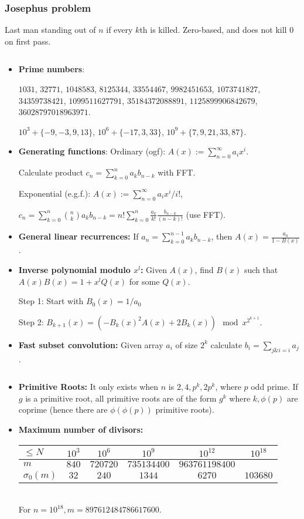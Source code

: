 \documentclass[8pt,a4paper,landscape,oneside]{amsart}
\newcommand{\mintedstyle}[2]{\inputminted[fontsize=\normalsize,baselinestretch=.9,breaklines,breakautoindent,tabsize=2]{#1}{code/#2}}
\newcommand{\code}[1]{\mintedstyle{cpp}{#1}}
\newcommand*\BitAnd{\mathrel{\&}}
\newenvironment{myitemize}
{\begin{itemize}[leftmargin=.3cm]
	\setlength{\itemsep}{0pt}
	\setlength{\parskip}{0pt}
	\setlength{\parsep}{0pt}     }
{ \end{itemize}                  }
\begin{document}
\begin{multicols*}{3}
\subsubsection{Josephus problem}
Last man standing out of $n$ if every $k$th is killed. Zero-based, and
does not kill $0$ on first pass.
\code{math/josephus.cpp}

\begin{myitemize}
	\item \textbf{Prime numbers}:

	$1031$, $32771$, $1048583$, $8125344$, $33554467$, $9982451653$, $1073741827$, $34359738421$, $1099511627791$, $35184372088891$, $1125899906842679$, $36028797018963971$.

	$10^3 + \{-9,-3,9,13\}$, $10^6 + \{-17,3,33\}$, $10^9+ \{7,9,21,33,87\}$.

	\item \textbf{Generating functions}:
	Ordinary (ogf): $A(x) := \sum_{n=0}^{\infty} a_i x^i$.

	Calculate product $c_n = \sum_{k=0}^{n} a_k b_{n-k}$ with FFT.

	Exponential (e.g.f.): $A(x) := \sum_{n=0}^{\infty} a_i x^i/i!$,

	$c_n = \sum_{k=0}^{n} \binom{n}{k} a_k b_{n-k} = n! \sum_{k=0}^{n} \frac{a_k}{k!} \frac{b_{n-k}}{(n-k)!}$ (use FFT).

\item \textbf{General linear recurrences:}
	If $a_n = \sum_{k=0}^{n-1} a_k b_{n-k}$, then $A(x) = \frac{a_0}{1-B(x)}$.

\item \textbf{Inverse polynomial modulo $x^l$:}
	Given $A(x)$, find $B(x)$ such that $A(x)B(x) = 1 + x^l Q(x)$ for some $Q(x)$.

	Step 1: Start with $B_0(x) = 1/a_0$

	Step 2: $B_{k+1}(x) = (-B_k(x)^2 A(x) + 2 B_k(x)) \mod x^{2^{k+1}}$.

\item \textbf{Fast subset convolution:}
	Given array $a_i$ of size $2^k$ calculate $b_i = \sum_{j \BitAnd i = i} a_j$.
	\code{math/subset_conv.cpp}

\item \textbf{Primitive Roots:}
	It only exists when $n$ is $2, 4, p^k, 2p^k$, where $p$ odd prime.
	If $g$ is a primitive root, all primitive roots are of the form $g^k$
	where $k,\phi(p)$ are coprime (hence there are $\phi(\phi(p))$ primitive roots).
	
\item \textbf{Maximum number of divisors:} \\
	\begin{tabular}{|l|ccccc|}
   \hline
   $\leq N$ & $10^3$ & $10^6$ & $10^9$ & $10^{12}$ & $10^{18}$ \\
   \hline
   $m$ & $840$ & $720720$ & $735134400$ & $963761198400$ & \\
   \hline
   $\sigma_0(m)$ & $32$ & $240$ & $1344$ & $6270$ & $103680$ \\
   \hline
   \end{tabular}\\
   For $n = 10^{18}, m = 897612484786617600$.


\end{myitemize}
\end{multicols*}
\end{document}
